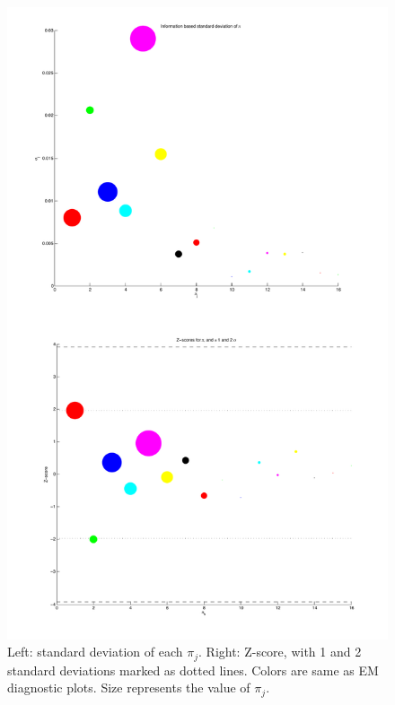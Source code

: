 \documentclass[12pt]{amsart}
\begin{document}
\begin{figure}
	
	\begin{center}
		\includegraphics[scale=0.5]{zsc.pdf}
	\end{center}
	\caption{Left: standard deviation of each $\pi_j$. Right: Z-score, with 1 and 2 standard deviations marked as dotted lines. Colors are same as EM diagnostic plots. Size represents the value of $\pi_j$.}
\end{figure}
\end{document}
